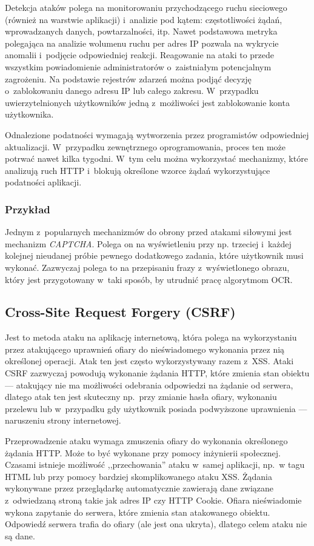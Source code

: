 \documentclass[12pt,a4paper,polish,thesis]{dcsbook}
\begin{document}
Detekcja ataków polega na monitorowaniu przychodzącego ruchu sieciowego (również na warstwie aplikacji) i~analizie pod kątem: częstotliwości żądań, wprowadzanych danych, powtarzalności, itp. Nawet podstawowa metryka polegająca na analizie wolumenu ruchu per adres IP pozwala na wykrycie anomalii i~podjęcie odpowiedniej reakcji. Reagowanie na ataki to przede wszystkim powiadomienie administratorów o~zaistniałym potencjalnym zagrożeniu. Na podstawie rejestrów zdarzeń można podjąć decyzję o~zablokowaniu danego adresu IP lub całego zakresu. W~przypadku uwierzytelnionych użytkowników jedną z~możliwości jest zablokowanie konta użytkownika.

Odnalezione podatności wymagają wytworzenia przez programistów odpowiedniej aktualizacji. W~przypadku zewnętrznego oprogramowania, proces ten może potrwać nawet kilka tygodni. W~tym celu można wykorzystać mechanizmy, które analizują ruch HTTP i~blokują określone wzorce żądań wykorzystujące podatności aplikacji.

\subsubsection*{Przykład}
Jednym z~popularnych mechanizmów do obrony przed atakami siłowymi jest mechanizm \textit{CAPTCHA}. Polega on na wyświetleniu przy np. trzeciej i~każdej kolejnej nieudanej próbie pewnego dodatkowego zadania, które użytkownik musi wykonać. Zazwyczaj polega to na przepisaniu frazy z~wyświetlonego obrazu, który jest przygotowany w~taki sposób, by utrudnić pracę algorytmom OCR. 


\subsection{Cross-Site Request Forgery (CSRF)}
Jest to metoda ataku na aplikację internetową, która polega na wykorzystaniu przez atakującego uprawnień ofiary do nieświadomego wykonania przez nią określonej operacji. Atak ten jest często wykorzystywany razem z~XSS.
Ataki CSRF zazwyczaj powodują wykonanie żądania HTTP, które zmienia stan obiektu --- atakujący nie ma możliwości odebrania odpowiedzi na żądanie od serwera, dlatego atak ten jest skuteczny np.~przy zmianie hasła ofiary, wykonaniu przelewu lub w~przypadku gdy użytkownik posiada podwyższone uprawnienia --- naruszeniu strony internetowej.

Przeprowadzenie ataku wymaga zmuszenia ofiary do wykonania określonego żądania HTTP. Może to być wykonane przy pomocy inżynierii społecznej. Czasami istnieje możliwość ,,przechowania'' ataku w~samej aplikacji, np.~w tagu HTML lub przy pomocy bardziej skomplikowanego ataku XSS. Żądania wykonywane przez przeglądarkę automatycznie zawierają dane związane z~odwiedzaną stroną takie jak adres IP czy HTTP Cookie. Ofiara nieświadomie wykona zapytanie do serwera, które zmienia stan atakowanego obiektu. Odpowiedź serwera trafia do ofiary (ale jest ona ukryta), dlatego celem ataku nie są dane.
\end{document}
